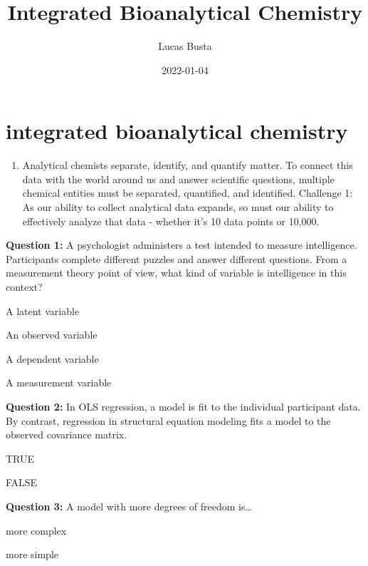 \documentclass[
]{krantz}
\title{Integrated Bioanalytical Chemistry}
\author{Lucas Busta}
\date{2022-01-04}
\providecommand{\tightlist}{%
  \setlength{\itemsep}{0pt}\setlength{\parskip}{0pt}}
\begin{document}
\maketitle

{
\setcounter{tocdepth}{2}
\tableofcontents
}
\hypertarget{integrated-bioanalytical-chemistry}{%
\section*{integrated bioanalytical chemistry}\label{integrated-bioanalytical-chemistry}}

\begin{enumerate}
\def\labelenumi{\arabic{enumi}.}
\tightlist
\item
  Analytical chemists separate, identify, and quantify matter. To connect this data with the world around us and answer scientific questions, multiple chemical entities must be separated, quantified, and identified. Challenge 1: As our ability to collect analytical data expands, so must our ability to effectively analyze that data - whether it's 10 data points or 10,000.
\end{enumerate}

\textbf{Question 1:}
A psychologist administers a test intended to measure intelligence. Participants complete different puzzles and answer different questions. From a measurement theory point of view, what kind of variable is intelligence in this context?

A latent variable

An observed variable

A dependent variable

A measurement variable

\hypertarget{collapseExample1}{}
\hypertarget{answerFeedback1}{}

\textbf{Question 2:}
In OLS regression, a model is fit to the individual participant data. By contrast, regression in structural equation modeling fits a model to the observed covariance matrix.

TRUE

FALSE

\hypertarget{collapseExample2}{}
\hypertarget{answerFeedback2}{}

\textbf{Question 3:}
A model with more degrees of freedom is\ldots{}

more complex

more simple

\hypertarget{collapseExample3}{}
\hypertarget{answerFeedback3}{}
\end{document}
